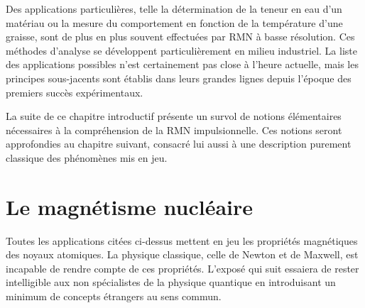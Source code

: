 Des applications particulières, telle la détermination de la teneur en eau d'un
matériau ou la mesure du comportement en fonction de la température d'une graisse,
sont de plus en plus souvent effectuées par RMN à basse résolution.
Ces méthodes d'analyse se développent particulièrement en milieu industriel.
La liste des applications possibles n'est certainement pas close à l'heure actuelle,
mais les principes sous-jacents sont établis dans leurs grandes lignes depuis l'époque
des premiers succès expérimentaux.

La suite de ce chapitre introductif présente un survol de notions élémentaires
nécessaires à la compréhension de la RMN impulsionnelle.
Ces notions seront approfondies au chapitre suivant, consacré lui aussi
à une description purement classique des phénomènes mis en jeu.

\section{Le magnétisme nucléaire}
Toutes les applications citées ci-dessus mettent en jeu les propriétés magnétiques
des noyaux atomiques.
La physique classique, celle de Newton et de Maxwell, est
incapable de rendre compte de ces propriétés.
L'exposé qui suit essaiera de rester intelligible aux non spécialistes de
la physique quantique en introduisant un minimum de concepts
étrangers au sens commun.

